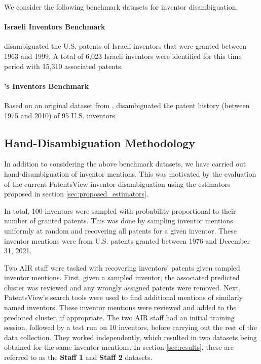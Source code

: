\documentclass[fontsize=11pt]{article}
\newcommand{\ob}[1]{{#1}}
\theoremstyle{definition}
\begin{document}
We consider the following benchmark datasets for inventor disambiguation.

\paragraph{Israeli Inventors Benchmark}
\cite{trajtenberg2008identification} disambiguated the U.S. patents of Israeli inventors that were granted between 1963 and 1999. A total of 6,023 Israeli inventors were identified for this time period with 15,310 associated patents.

\paragraph{\cite{Li2014}'s Inventors Benchmark}

Based on an original dataset from \cite{gu2008march}, \cite{Li2014} disambiguated the patent history (between 1975 and 2010) of 95 U.S. inventors.


\subsection{Hand-Disambiguation Methodology}\label{sec:hand-disambiguation}

In addition to considering the above benchmark datasets, {we have carried out hand-disambiguation of inventor mentions. This was motivated by the evaluation of the current PatentsView inventor disambiguation using the estimators proposed in section \ref{sec:proposed_estimators}.}

In total, 100 inventors were sampled with probability proportional to their number of granted patents. This was done by sampling inventor mentions uniformly at random and recovering all patents for a given inventor. These inventor mentions were from U.S. patents granted between 1976 and December 31, 2021.

Two AIR staff were tasked with recovering inventors' patents given sampled inventor mentions. First, given a sampled inventor, the associated predicted cluster was reviewed \ob{and any wrongly} assigned patents were removed. Next, PatentsView's search tools were used to find additional mentions of similarly named inventors. These inventor mentions were reviewed \ob{and added} to the predicted cluster, if appropriate. The two AIR staff had an initial training session, followed by a test run on 10 inventors, before carrying out the rest of the data collection. They worked independently, which resulted in two datasets being obtained for the same inventor mentions. In section \ref{sec:results}, these are referred to as the \textbf{Staff 1} and \textbf{Staff 2} datasets.
\end{document}
